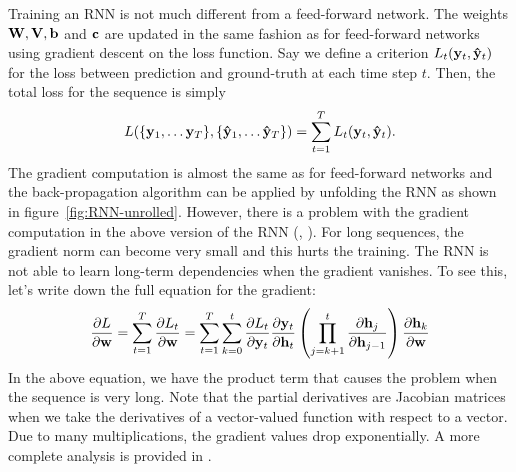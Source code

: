		Training an RNN is not much different from a feed-forward network.
		The weights $\mathbf{W}, \mathbf{V}, \mathbf{b}$ and $\mathbf{c}$ are updated in the same fashion as for feed-forward networks using gradient descent on the loss function.
		Say we define a criterion $L_t(\mathbf{y}_t, \mathbf{\hat{y}}_t)$ for the loss between prediction and ground-truth at each time step $t$.
		Then, the total loss for the sequence is simply 
		\begin{equation}\label{eq:loss_for_rnn}
			L(\{\mathbf{y}_1, \dots \mathbf{y}_T\}, \{\mathbf{\hat{y}}_1, \dots \mathbf{\hat{y}}_T\}) = \sum_{t=1}^{T} L_t(\mathbf{y}_t, \mathbf{\hat{y}}_t).
		\end{equation}
		The gradient computation is almost the same as for feed-forward networks and the back-propagation algorithm can be applied by unfolding the RNN as shown in figure~\ref{fig:RNN-unrolled}.
		However, there is a problem with the gradient computation in the above version of the RNN (\cite{pascanu2013difficulty}, \cite{bengio1994learning}).
		For long sequences, the gradient norm can become very small and this hurts the training.
		The RNN is not able to learn long-term dependencies when the gradient vanishes.
		To see this, let's write down the full equation for the gradient:
		\begin{equation}
			\frac{\partial L}{\partial \mathbf{w}}
			= \sum_{t=1}^{T} 
				\frac{\partial L_t}{\partial \mathbf{w}}
			= \sum_{t=1}^{T} 
				\sum_{k=0}^{t} 
					\frac{\partial L_t}{\partial \mathbf{y}_t}
					\frac{\partial \mathbf{y}_t}{\partial \mathbf{h}_t}
					\left(
						\prod_{j=k+1}^{t} \frac{\partial \mathbf{h}_j}{\partial \mathbf{h}_{j-1}}
					\right)
					\frac{\partial \mathbf{h}_{k}}{\partial \mathbf{w}}
		\end{equation}
		In the above equation, we have the product term that causes the problem when the sequence is very long.
		Note that the partial derivatives are Jacobian matrices when we take the derivatives of a vector-valued function with respect to a vector.
		Due to many multiplications, the gradient values drop exponentially.
		A more complete analysis is provided in \cite{pascanu2013difficulty}.
		
